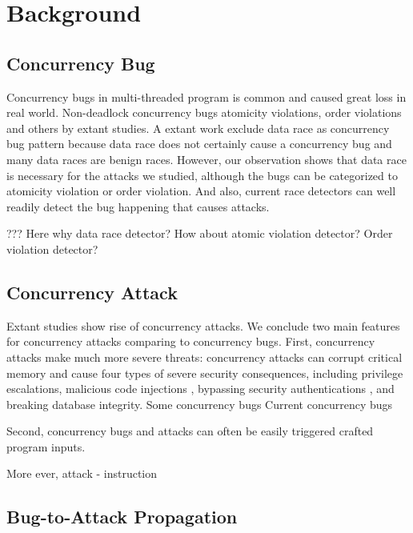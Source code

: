 \section{Background}\label{sec:background}

\subsection{Concurrency Bug}

Concurrency bugs in multi-threaded program is common and caused great loss in real world. 
Non-deadlock concurrency bugs 
atomicity violations\cite{}, order violations\cite{} and others by extant studies\cite{lu:concurrency-bugs,conmem:asplos10}. 
A extant work exclude data race as concurrency bug pattern 
because data race does not certainly cause a concurrency bug\cite{lu:concurrency-bugs} and many data races are benign races. 
However, our observation shows that data race is necessary for the attacks we studied, 
although the bugs can be categorized to atomicity violation or order violation. 
And also, current race detectors can well readily detect the bug happening that causes attacks.

??? Here why data race detector? How about atomic violation detector? Order violation detector?
 
\subsection{Concurrency Attack}
Extant studies \cite{con:hotpar12, acidrain:sigmod17} show rise of concurrency 
attacks. We conclude two main features for concurrency attacks comparing to concurrency bugs. 
First, concurrency attacks make much more severe threats:
concurrency attacks can corrupt critical memory and cause four
types of severe security consequences, including privilege escalations\cite{uselib-bug-12791, mysql-bug-24988},
malicious code injections \cite{msiexploit},  
bypassing security authentications\cite{cve-2010-0923, cve-2008-0034, cve-2010-1754}
, and breaking database integrity\cite{acidrain:sigmod17}. 
Some concurrency bugs 
Current concurrency bugs 


Second, concurrency bugs and attacks can often be easily
triggered crafted program inputs. 

More ever, attack - instruction


\subsection{Bug-to-Attack Propagation}





